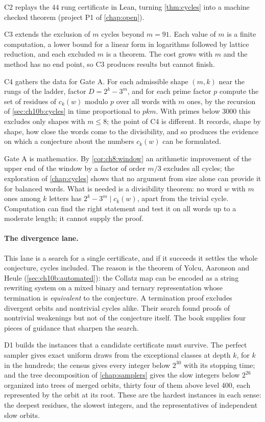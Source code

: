 C2 replays the $44$ rung certificate in Lean, turning
\cref{thm:cycles} into a machine checked theorem (project P1 of \cref{chap:open}).

C3 extends the exclusion of $m$ cycles beyond $m=91$. Each value of $m$ is a
finite computation, a lower bound for a linear form in logarithms followed by
lattice reduction, and each excluded $m$ is a theorem. The cost grows with $m$
and the method has no end point, so C3 produces results but cannot finish.

C4 gathers the data for Gate A. For each admissible shape $(m,k)$ near the rungs
of the ladder, factor $D=2^k-3^m$, and for each prime factor $p$ compute the
set of residues of $c_k(w)$ modulo $p$ over all words with $m$ ones, by the
recursion of \cref{sec:ch10b:cycles} in time proportional to $pkm$. With primes
below $3000$ this excludes only shapes with $m\le8$; the point of C4 is
different. It records, shape by shape, how close the words come to the
divisibility, and so produces the evidence on which a conjecture about the
numbers $c_k(w)$ can be formulated.

Gate A is mathematics. By \cref{cor:ch8:window} an arithmetic improvement of
the upper end of the window by a factor of order $m/3$ excludes all cycles; the
exploration of \cref{chap:cycles} shows that no argument from size alone can
provide it for balanced words. What is needed is a divisibility theorem: no
word $w$ with $m$ ones among $k$ letters has $2^k-3^m\mid c_k(w)$, apart from
the trivial cycle. Computation can find the right statement and test it on all
words up to a moderate length; it cannot supply the proof.

\paragraph{The divergence lane.} This lane is a search for a single
certificate, and if it succeeds it settles the whole conjecture, cycles
included. The reason is the theorem of Yolcu, Aaronson and Heule
(\cref{sec:ch10b:automated}): the Collatz map can be encoded as a string
rewriting system on a mixed binary and ternary representation whose
termination is \emph{equivalent} to the conjecture. A termination proof
excludes divergent orbits and nontrivial cycles alike. Their search found
proofs of nontrivial weakenings but not of the conjecture itself. The book
supplies four pieces of guidance that sharpen the search.

D1 builds the instances that a candidate certificate must survive. The perfect
sampler gives exact uniform draws from the exceptional classes at depth $k$, for
$k$ in the hundreds; the census gives every integer below $2^{30}$ with its
stopping time; and the tree decomposition of \cref{chap:samplers} gives the
slow integers below $2^{26}$ organized into trees of merged orbits, thirty four
of them above level $400$, each represented by the orbit at its root. These are the hardest instances in each sense: the
deepest residues, the slowest integers, and the representatives of
independent slow orbits.

